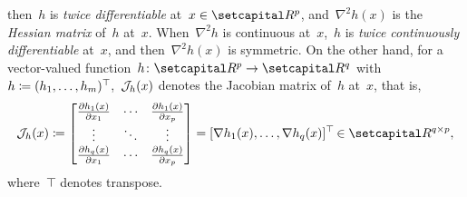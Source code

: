 \documentclass[../main]{subfiles}
\begin{document}
then~$h$ is \emph{twice differentiable} at~$x \in \setR^p$, and~$\nabla^2 h(x)$ is the \emph{Hessian matrix} of~$h$ at~$x$.
When~$\nabla^2 h$ is continuous at~$x$,~$h$ is \emph{twice continuously differentiable} at~$x$, and then~$\nabla^2 h(x)$ is symmetric.
On the other hand, for a vector-valued function~$h \colon \setR^p \to \setR^q$ with~$h \coloneqq (h_1, \dots, h_m)^\top\hspace{-1pt}$,~$\mathcal{J}_{h}(x)$ denotes the Jacobian matrix of~$h$ at~$x$, that is,
\begin{equation} \label{eq:jac}
    \jdv{h}{x} \coloneqq
    \begin{bmatrix}
        \pdv{h_1(x)}{x_1} & \cdots & \pdv{h_1(x)}{x_p} \\
        \vdots            & \ddots & \vdots            \\
        \pdv{h_q(x)}{x_1} & \cdots & \pdv{h_q(x)}{x_p}
    \end{bmatrix}
    = [ \nabla h_1(x), \dots, \nabla h_q(x) ]^\T \in \setR^{q \times p}
    ,\end{equation}
where~$\top\hspace{-1pt}$ denotes transpose.
\end{document}
